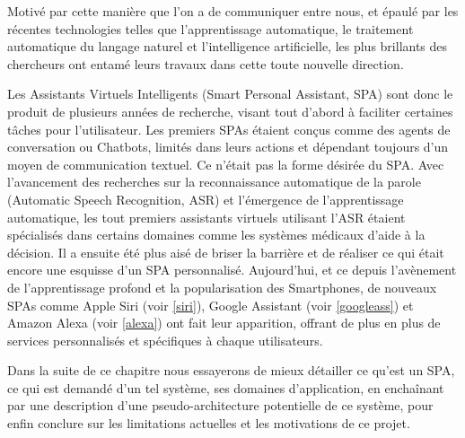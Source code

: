 \par 
Motivé par cette manière que l'on a de communiquer entre nous, et épaulé par les récentes technologies telles que l'apprentissage automatique, le traitement automatique du langage naturel et l'intelligence artificielle, les plus brillants des chercheurs ont entamé leurs travaux dans cette toute nouvelle direction.
\par 
Les Assistants Virtuels Intelligents (Smart Personal Assistant, SPA) sont donc le produit de plusieurs années de recherche, visant tout d'abord à faciliter certaines tâches pour l'utilisateur. Les premiers SPAs étaient conçus comme des agents de conversation ou Chatbots, limités dans leurs actions et dépendant toujours d'un moyen de communication textuel. Ce n'était pas la forme désirée du SPA. Avec l'avancement des recherches sur la reconnaissance automatique de la parole (Automatic Speech Recognition, ASR) et l'émergence de l'apprentissage automatique, les tout premiers assistants virtuels utilisant l'ASR étaient spécialisés dans certains domaines comme les systèmes médicaux d'aide à la décision. Il a ensuite été plus aisé de briser la barrière et de réaliser ce qui était encore une esquisse d'un SPA personnalisé. Aujourd'hui, et ce depuis l'avènement de l'apprentissage profond et la popularisation des Smartphones, de nouveaux SPAs comme Apple Siri (voir \ref{siri}), Google Assistant (voir \ref{googleass}) et Amazon Alexa (voir \ref{alexa}) ont fait leur apparition, offrant de plus en plus de services personnalisés et spécifiques à chaque utilisateurs.
\par 

Dans la suite de ce chapitre nous essayerons de mieux détailler ce qu'est un SPA, ce qui est demandé d'un tel système, ses domaines d'application, en enchaînant par une description d'une pseudo-architecture potentielle de ce système, pour enfin  conclure sur les limitations actuelles et les motivations de ce projet. 

\newpage

